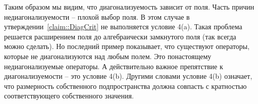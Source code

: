 Таким образом мы видим, что диагонализуемость зависит от поля. Часть причин недиагонализуемости -- плохой выбор поля. В этом случае в утверждении~\ref{claim::DiagCrit} не выполняется условие 4(a). Такая проблема решается расширением поля до алгебраически замкнутого поля (так всегда можно сделать). Но последний пример показывает, что существуют операторы, которые не диагонализуются над любым полем. Это понастоящему недиагонализуемые операторы. А действительно важное препятствие к диагонализуемости -- это условие 4(b). Другими словами условие 4(b) означает, что размерность собственного подпространства должна совпасть с кратностью соответствующего собственного значения.

